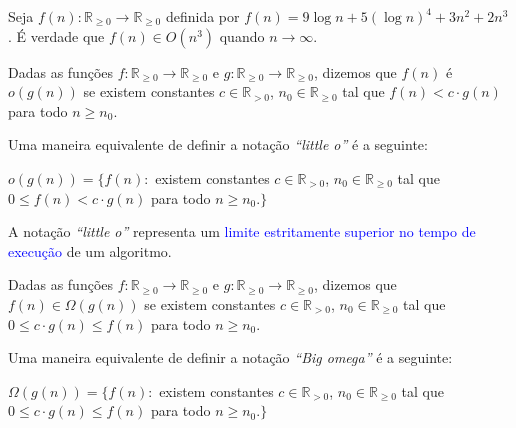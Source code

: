 \begin{exerc}
Seja $f(n):\mathbb{R}_{\geq 0}\rightarrow \mathbb{R}_{\geq 0}$ definida por $f(n)=9\log n + 5(\log n)^4 +3n^2 + 2n^3$. É verdade que $f(n)\in O(n^3)$ quando $n\rightarrow \infty$.    
\end{exerc}

\begin{defn} 
Dadas as funções $f:\mathbb{R}_{\geq 0}\rightarrow \mathbb{R}_{\geq 0}$ e $g:\mathbb{R}_{\geq 0}\rightarrow \mathbb{R}_{\geq 0}$, dizemos que $f(n)$ é $o(g(n))$ se existem constantes $c\in\mathbb{R}_{>0}$, $n_0\in \mathbb{R}_{\geq 0}$ tal que $f(n) < c\cdot g(n)$ para todo $n \geq n_0$. 
\end{defn}
\vspace{0.2cm}

Uma maneira equivalente de definir a notação \textit{``little o''} é a seguinte:
\vspace{0.3cm}

\begin{defn}
$o(g(n)) = \{ f(n):$ existem constantes $c\in\mathbb{R}_{>0}$, $n_0\in \mathbb{R}_{\geq 0}$ tal que $0 \leq f(n) < c\cdot g(n)$ para todo $n \geq n_0.\}$
\end{defn}\vspace{0.3cm}

A notação \textit{``little o''}  representa um \textcolor{blue}{limite estritamente superior no tempo de execução} de um algoritmo. 

\begin{defn} 
Dadas as funções $f:\mathbb{R}_{\geq 0}\rightarrow \mathbb{R}_{\geq 0}$ e $g:\mathbb{R}_{\geq 0}\rightarrow \mathbb{R}_{\geq 0}$, dizemos que $f(n) \in \Omega(g(n))$ se existem constantes $c\in\mathbb{R}_{>0}$, $n_0\in \mathbb{R}_{\geq 0}$ tal que $0\leq c\cdot g(n) \leq f(n)$  para todo $n \geq n_0$. 
\end{defn}   \vspace{0.2cm}

Uma maneira equivalente de definir a notação \textit{``Big omega''}  é a seguinte:
\vspace{0.3cm}

\begin{defn}
$\Omega(g(n)) = \{ f(n):$ existem constantes $c\in\mathbb{R}_{>0}$, $n_0\in \mathbb{R}_{\geq 0}$ tal que $0 \leq c\cdot g(n) \leq f(n)$ para todo $n \geq n_0.\}$
\end{defn}\vspace{0.3cm}

